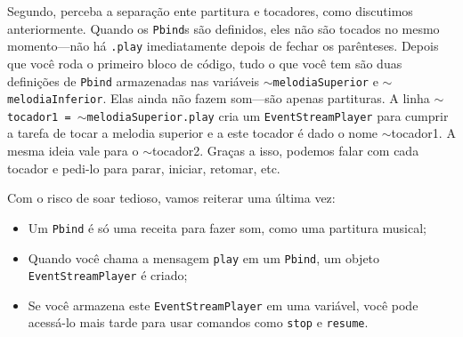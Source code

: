 Segundo, perceba a separação ente partitura e tocadores, como discutimos anteriormente. Quando os \texttt{Pbind}s são definidos, eles não são tocados no mesmo momento---não há \texttt{.play} imediatamente depois de fechar os parênteses. Depois que você roda o primeiro bloco de código, tudo o que você tem são duas definições de \texttt{Pbind} armazenadas nas variáveis \texttt{$\sim$melodiaSuperior} e \texttt{$\sim$melodiaInferior}. Elas ainda não fazem som---são apenas partituras. A linha \texttt{$\sim$tocador1 = $\sim$melodiaSuperior.play} cria um \texttt{EventStreamPlayer} para cumprir a tarefa de tocar a melodia superior e a este tocador é dado o nome $\sim$tocador1. A mesma ideia vale para o $\sim$tocador2. Graças a isso, podemos falar com cada tocador e pedi-lo para parar, iniciar, retomar, etc.

Com o risco de soar tedioso, vamos reiterar uma última vez:
\begin{itemize}
\item Um \texttt{Pbind} é só uma receita para fazer som, como uma partitura musical;
\item Quando você chama a mensagem \texttt{play} em um \texttt{Pbind}, um objeto \texttt{EventStreamPlayer} é criado;
\item Se você armazena este \texttt{EventStreamPlayer} em uma variável, você pode acessá-lo mais tarde para usar comandos como \texttt{stop} e \texttt{resume}.
\end{itemize} 
